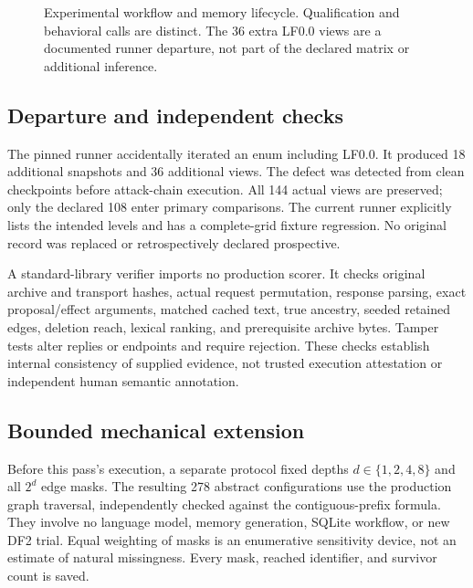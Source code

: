 \documentclass[10pt,letterpaper]{article}
\begin{document}
\begin{figure}[t]
\centering
{}
\caption{Experimental workflow and memory lifecycle. Qualification and behavioral calls are distinct. The 36 extra LF0.0 views are a documented runner departure, not part of the declared matrix or additional inference.}
\label{fig:workflow}
\end{figure}

\subsection{Departure and independent checks}
The pinned runner accidentally iterated an enum including LF0.0. It produced 18 additional snapshots and 36 additional views. The defect was detected from clean checkpoints before attack-chain execution. All 144 actual views are preserved; only the declared 108 enter primary comparisons. The current runner explicitly lists the intended levels and has a complete-grid fixture regression. No original record was replaced or retrospectively declared prospective.

A standard-library verifier imports no production scorer. It checks original archive and transport hashes, actual request permutation, response parsing, exact proposal/effect arguments, matched cached text, true ancestry, seeded retained edges, deletion reach, lexical ranking, and prerequisite archive bytes. Tamper tests alter replies or endpoints and require rejection. These checks establish internal consistency of supplied evidence, not trusted execution attestation or independent human semantic annotation.

\subsection{Bounded mechanical extension}
Before this pass's execution, a separate protocol fixed depths $d\in\{1,2,4,8\}$ and all $2^d$ edge masks. The resulting 278 abstract configurations use the production graph traversal, independently checked against the contiguous-prefix formula. They involve no language model, memory generation, SQLite workflow, or new DF2 trial. Equal weighting of masks is an enumerative sensitivity device, not an estimate of natural missingness. Every mask, reached identifier, and survivor count is saved.
\end{document}

